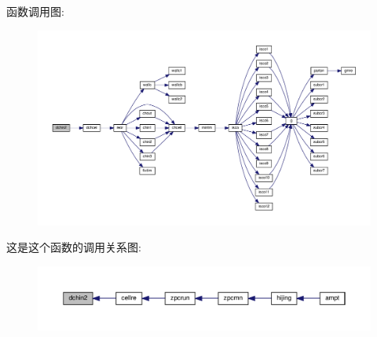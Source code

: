 函数调用图\+:
\nopagebreak
\begin{figure}[H]
\begin{center}
\leavevmode
\includegraphics[width=350pt]{dchin2_8f90_ad968e709dbcabfedc92fda7f55c43606_cgraph}
\end{center}
\end{figure}
这是这个函数的调用关系图\+:
\nopagebreak
\begin{figure}[H]
\begin{center}
\leavevmode
\includegraphics[width=350pt]{dchin2_8f90_ad968e709dbcabfedc92fda7f55c43606_icgraph}
\end{center}
\end{figure}
